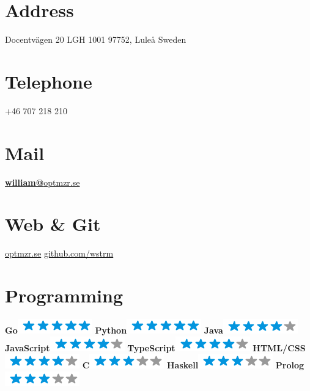 \documentclass[]{friggeri-cv}
\begin{document}

\begin{aside}
  \section{Address}
    Docentvägen 20
    LGH 1001
    97752, Luleå
    Sweden
    ~
  \section{Telephone}
    +46 707 218 210
    ~
  \section{Mail}
    \href{mailto:william@optmzr.se}{\textbf{william@}optmzr.se}
    ~
  \section{Web \& Git}
    \href{https://optmzr.se}{optmzr.se}
    \href{https://github.com/optmzr}{github.com/wstrm}
    ~
  \section{Programming}
    \textbf{Go}\includegraphics[scale=0.40]{img/5stars.png}
    \textbf{Python}\includegraphics[scale=0.40]{img/5stars.png}
    \textbf{Java}\includegraphics[scale=0.40]{img/4stars.png}
    \textbf{JavaScript}\includegraphics[scale=0.40]{img/4stars.png}
    \textbf{TypeScript}\includegraphics[scale=0.40]{img/4stars.png}
    \textbf{HTML/CSS}\includegraphics[scale=0.40]{img/4stars.png}
    \textbf{C}\includegraphics[scale=0.40]{img/3stars.png}
    \textbf{Haskell}\includegraphics[scale=0.40]{img/3stars.png}
    \textbf{Prolog}\includegraphics[scale=0.40]{img/3stars.png}
    ~

\end{aside}
\end{document}
